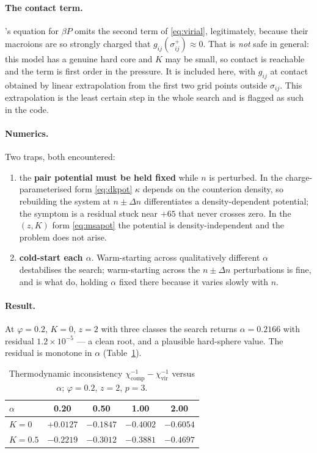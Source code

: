 \documentclass[11pt,a4paper]{article}
\begin{document}
\paragraph{The contact term.} \cite{daguanno1991}'s equation for $\beta P$
omits the second term of \eqref{eq:virial}, legitimately, because their
macroions are so strongly charged that $g_{ij}(\sigma_{ij}^+)\approx0$. That
is \emph{not} safe in general: this model has a genuine hard core and $K$ may
be small, so contact is reachable and the term is first order in the
pressure. It is included here, with $g_{ij}$ at contact obtained by linear
extrapolation from the first two grid points outside $\sigma_{ij}$. This
extrapolation is the least certain step in the whole search and is flagged as
such in the code.

\paragraph{Numerics.} Two traps, both encountered:
\begin{enumerate}[nosep]
\item the \textbf{pair potential must be held fixed} while $n$ is perturbed.
      In the charge-parameterised form \eqref{eq:dkpot} $\kappa$ depends on
      the counterion density, so rebuilding the system at $n\pm\Delta n$
      differentiates a density-dependent potential; the symptom is a residual
      stuck near $+65$ that never crosses zero. In the $(z,K)$ form
      \eqref{eq:msapot} the potential is density-independent and the problem
      does not arise.
\item \textbf{cold-start each $\alpha$}. Warm-starting across qualitatively
      different $\alpha$ destabilises the search; warm-starting across the
      $n\pm\Delta n$ perturbations is fine, and is what \cite{daguanno1991}
      do, holding $\alpha$ fixed there because it varies slowly with $n$.
\end{enumerate}

\paragraph{Result.} At $\varphi=0.2$, $K=0$, $z=2$ with three classes the
search returns $\alpha=0.2166$ with residual $1.2\times10^{-5}$ --- a clean
root, and a plausible hard-sphere value. The residual is monotone in
$\alpha$ (Table~\ref{tab:alpha}).

\begin{table}[htbp]
\centering
\caption{Thermodynamic inconsistency
$\chi^{-1}_{\text{comp}}-\chi^{-1}_{\text{vir}}$ versus $\alpha$;
$\varphi=0.2$, $z=2$, $p=3$.}
\label{tab:alpha}
\begin{tabular}{lcccc}
\toprule
$\alpha$ & 0.20 & 0.50 & 1.00 & 2.00\\
\midrule
$K=0$   & $+0.0127$ & $-0.1847$ & $-0.4002$ & $-0.6054$\\
$K=0.5$ & $-0.2219$ & $-0.3012$ & $-0.3881$ & $-0.4697$\\
\bottomrule
\end{tabular}
\end{table}
\end{document}

